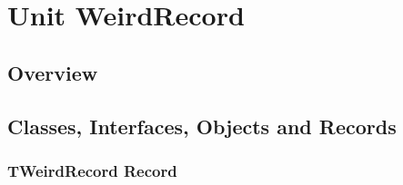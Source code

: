 \documentclass{report}
\newif\ifpdf
\begin{document}
\label{toc}\tableofcontents
\newpage
\newlength{\tmplength}
\chapter{Unit WeirdRecord}
\label{WeirdRecord}
\section{Overview}
\begin{description}
\item[\texttt{\begin{ttfamily}TWeirdRecord\end{ttfamily} Record}]
\end{description}
\section{Classes, Interfaces, Objects and Records}
\ifpdf
\subsection*{\large{\textbf{TWeirdRecord Record}}\normalsize\hspace{1ex}\hrulefill}
\else
\subsection*{TWeirdRecord Record}
\fi
\label{WeirdRecord.TWeirdRecord}
\end{document}

